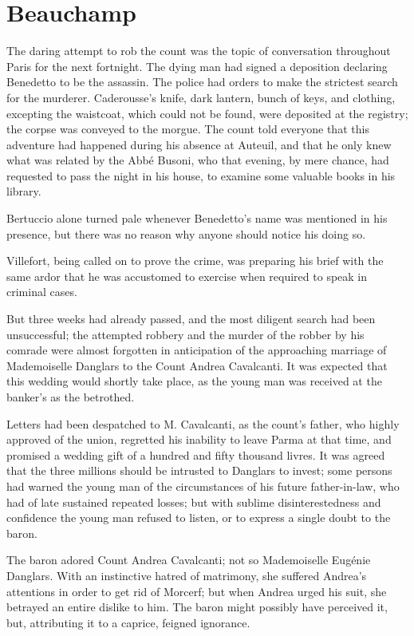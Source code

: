 \chapter{Beauchamp}

The daring attempt to rob the count was the topic of conversation
throughout Paris for the next fortnight. The dying man had signed a
deposition declaring Benedetto to be the assassin. The police had
orders to make the strictest search for the murderer. Caderousse’s
knife, dark lantern, bunch of keys, and clothing, excepting the
waistcoat, which could not be found, were deposited at the registry;
the corpse was conveyed to the morgue. The count told everyone that
this adventure had happened during his absence at Auteuil, and that he
only knew what was related by the Abbé Busoni, who that evening, by
mere chance, had requested to pass the night in his house, to examine
some valuable books in his library.

Bertuccio alone turned pale whenever Benedetto’s name was mentioned in
his presence, but there was no reason why anyone should notice his
doing so.

Villefort, being called on to prove the crime, was preparing his brief
with the same ardor that he was accustomed to exercise when required to
speak in criminal cases.

But three weeks had already passed, and the most diligent search had
been unsuccessful; the attempted robbery and the murder of the robber
by his comrade were almost forgotten in anticipation of the approaching
marriage of Mademoiselle Danglars to the Count Andrea Cavalcanti. It
was expected that this wedding would shortly take place, as the young
man was received at the banker’s as the betrothed.

Letters had been despatched to M. Cavalcanti, as the count’s father,
who highly approved of the union, regretted his inability to leave
Parma at that time, and promised a wedding gift of a hundred and fifty
thousand livres. It was agreed that the three millions should be
intrusted to Danglars to invest; some persons had warned the young man
of the circumstances of his future father-in-law, who had of late
sustained repeated losses; but with sublime disinterestedness and
confidence the young man refused to listen, or to express a single
doubt to the baron.

The baron adored Count Andrea Cavalcanti; not so Mademoiselle Eugénie
Danglars. With an instinctive hatred of matrimony, she suffered
Andrea’s attentions in order to get rid of Morcerf; but when Andrea
urged his suit, she betrayed an entire dislike to him. The baron might
possibly have perceived it, but, attributing it to a caprice, feigned
ignorance.

